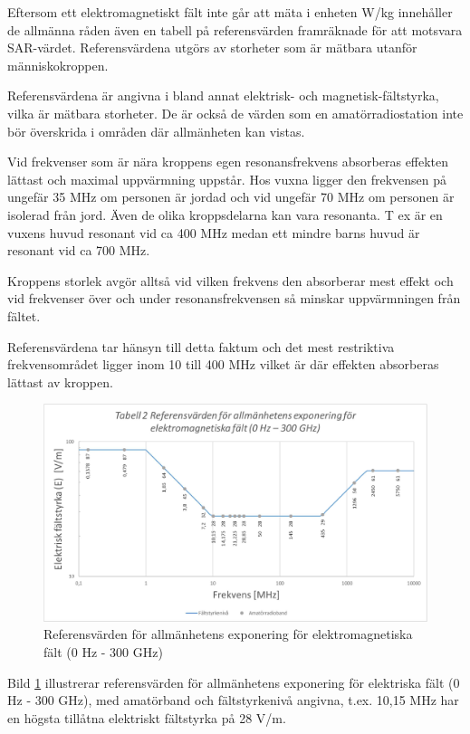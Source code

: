 Eftersom ett elektromagnetiskt fält inte går att mäta i enheten W/kg
innehåller de allmänna råden även en tabell på referensvärden
framräknade för att motsvara SAR-värdet. Referensvärdena utgörs av
storheter som är mätbara utanför människokroppen.

Referensvärdena är angivna i bland annat elektrisk- och
magnetisk-fältstyrka, vilka är mätbara storheter. De är också de
värden som en amatörradiostation inte bör överskrida i områden där
allmänheten kan vistas.

Vid frekvenser som är nära kroppens egen resonansfrekvens absorberas
effekten lättast och maximal uppvärmning uppstår. Hos vuxna ligger
den frekvensen på ungefär 35 MHz om personen är jordad och vid
ungefär 70 MHz om personen är isolerad från jord. Även de olika
kroppsdelarna kan vara resonanta. T ex är en vuxens huvud resonant
vid ca 400 MHz medan ett mindre barns huvud är resonant vid ca 700 MHz.

Kroppens storlek avgör alltså vid vilken frekvens den absorberar mest
effekt och vid frekvenser över och under resonansfrekvensen så minskar
uppvärmningen från fältet.

Referensvärdena tar hänsyn till detta faktum och det mest restriktiva
frekvensområdet ligger inom 10 till 400 MHz vilket är där effekten
absorberas lättast av kroppen.

\begin{figure}[h]
\begin{center}
\includegraphics[width=14cm]{images/emfbild-000}
\caption{Referensvärden för allmänhetens exponering för elektromagnetiska fält (0 Hz - 300 GHz)}
\label{fig:emf1}
\end{center}
\end{figure}

Bild \ref{fig:emf1} illustrerar referensvärden för allmänhetens
exponering för elektriska fält (0 Hz - 300 GHz), med amatörband
och fältstyrkenivå angivna, t.ex. 10,15 MHz har en högsta tillåtna
elektriskt fältstyrka på 28 V/m.

